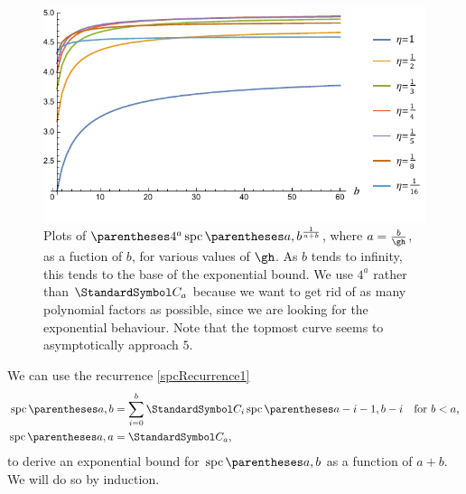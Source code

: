 \begin{figure}[htb!]
\centering
\includegraphics[scale=1]{spc-asymptotics}
\caption{Plots of $\pa{4^{a}\spc\of{a,b}}^{\frac{1}{a+b}}$,
where $a=\frac{b}{\gh}$,
as a fuction of $b$, for various values of $\gh$. As $b$ tends to infinity, this tends to the base
of the exponential bound.
We use $4^a$ rather than $\CatalanNumber a$ because we want to get rid of as many polynomial factors
as possible, since we are looking for the exponential behaviour.
Note that the topmost curve seems to asymptotically approach
$5$.\label{figSpcExperimental}}
\end{figure}

We can use the recurrence \ref{spcRecurrence1}
\begin{align*}\spc\of{a,b} &= \sum{i=0}[b]
\CatalanNumber {i}
\spc\of{a-i-1,b-i} &\text{for $b<a$,} \\
\spc\of{a,a} &= \CatalanNumber a \text,
\end{align*}
to derive an exponential bound for $\spc\of{a,b}$ as a function of $a+b$.
We will do so by induction.

